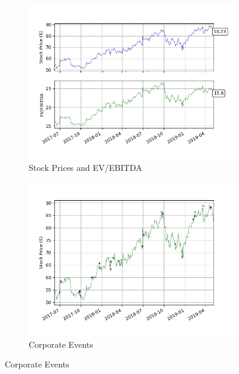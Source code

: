\documentclass{article}
\begin{document}
\begin{figure}[!h]

\begin{subfigure}[t]{0.6\linewidth}
\includegraphics[width=\linewidth]{charts/graph.jpg}
\caption{Stock Prices and EV/EBITDA}	
\end{subfigure}

\begin{subfigure}[b]{0.4\linewidth}
\includegraphics[width=\linewidth]{charts/events.jpg}
\caption{Corporate Events}
\end{subfigure}


\end{figure}
\end{document}
